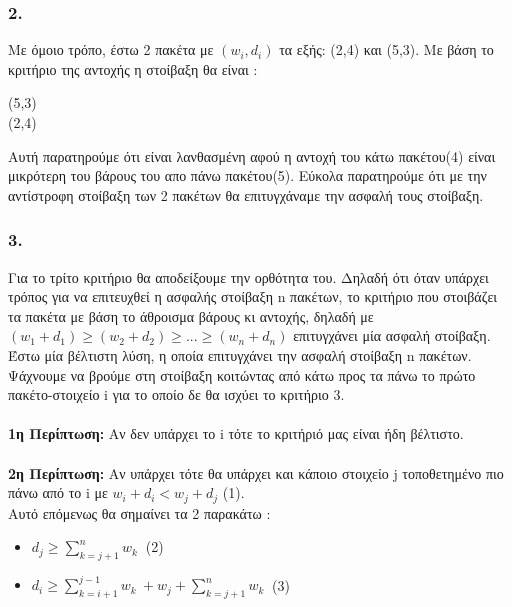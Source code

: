 \documentclass[12pt,a4paper]{article}
\begin{document}
\subsubsection*{2.} Με όμοιο τρόπο, έστω 2 πακέτα με $(w_{i},d_{i})$ τα εξής: (2,4) και (5,3). Με βάση το κριτήριο της αντοχής η στοίβαξη θα είναι :
\begin{center}
    (5,3) \\
    (2,4) 
\end{center}
Αυτή παρατηρούμε ότι είναι λανθασμένη αφού η αντοχή του κάτω πακέτου(4) είναι μικρότερη του βάρους του απο πάνω πακέτου(5). Εύκολα παρατηρούμε ότι με την αντίστροφη στοίβαξη των 2 πακέτων θα επιτυγχάναμε την ασφαλή τους στοίβαξη.

\subsubsection*{3.} 
Για το τρίτο κριτήριο θα αποδείξουμε την ορθότητα του. Δηλαδή ότι όταν υπάρχει τρόπος για να επιτευχθεί η ασφαλής στοίβαξη n πακέτων, το κριτήριο που στοιβάζει τα πακέτα με βάση το άθροισμα βάρους κι αντοχής, δηλαδή με $(w_{1}+d_{1})\ge (w_{2}+d_{2}) \ge... \ge (w_{n}+d_{n})$  επιτυγχάνει μία ασφαλή στοίβαξη. \\
Έστω μία βέλτιστη λύση, η οποία επιτυγχάνει την ασφαλή στοίβαξη n πακέτων. Ψάχνουμε να βρούμε στη στοίβαξη κοιτώντας από κάτω προς τα πάνω το πρώτο πακέτο-στοιχείο i για το οποίο δε θα ισχύει το κριτήριο 3.\\\\
 \textbf{1η Περίπτωση:} Αν δεν υπάρχει το i τότε το κριτήριό μας είναι ήδη βέλτιστο.\\\\
 \textbf{2η Περίπτωση:} Αν υπάρχει τότε θα υπάρχει και κάποιο στοιχείο j τοποθετημένο πιο πάνω από το i με $w_i + d_i < w_j + d_j$ (1). \\

Αυτό επόμενως θα σημαίνει τα 2 παρακάτω :
\begin{itemize}
    \item $d_j \ge \sum_{k=j+1}^{n} w_k \ $  (2)
    \item $d_i \ge \sum_{k=i+1}^{j-1} w_k \ + w_j + \sum_{k=j+1}^{n} w_k \ $  (3)
\end{itemize}
    
\end{document}
